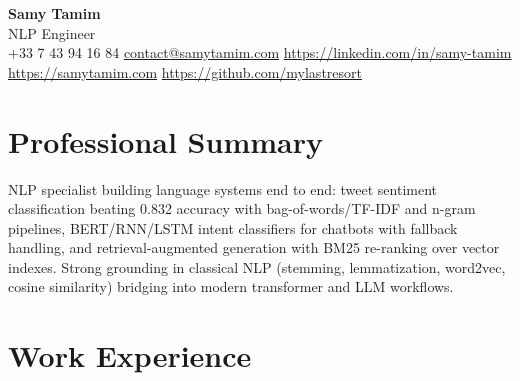 \documentclass[10pt,a4paper]{article}
\begin{document}
\begin{center}
  {\LARGE\bfseries\color{accent} Samy Tamim}\\[1.5pt]
  {\small NLP Engineer}\\[1.5pt]
  \footnotesize
  +33 7 43 94 16 84 \enspace\textbullet\enspace \href{mailto:contact@samytamim.com}{contact@samytamim.com} \enspace\textbullet\enspace \href{https://linkedin.com/in/samy-tamim}{https://linkedin.com/in/samy-tamim} \enspace\textbullet\enspace \href{https://samytamim.com}{https://samytamim.com} \enspace\textbullet\enspace \href{https://github.com/mylastresort}{https://github.com/mylastresort}
\end{center}

\section{Professional Summary}
NLP specialist building language systems end to end: tweet sentiment classification beating 0.832 accuracy with bag-of-words/TF-IDF and n-gram pipelines, BERT/RNN/LSTM intent classifiers for chatbots with fallback handling, and retrieval-augmented generation with BM25 re-ranking over vector indexes. Strong grounding in classical NLP (stemming, lemmatization, word2vec, cosine similarity) bridging into modern transformer and LLM workflows.

\section{Work Experience}
\end{document}
